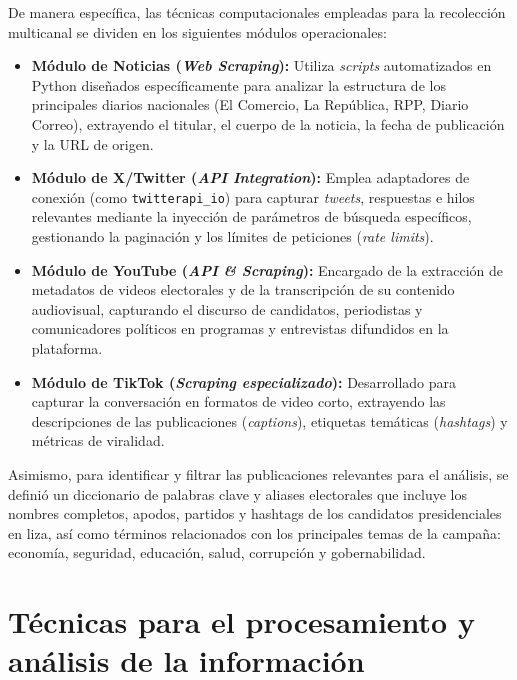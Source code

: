 De manera específica, las técnicas computacionales empleadas para la recolección multicanal se dividen en los siguientes módulos operacionales:
\begin{itemize}
    \item \textbf{Módulo de Noticias (\textit{Web Scraping}):} Utiliza \textit{scripts} automatizados en Python diseñados específicamente para analizar la estructura de los principales diarios nacionales (El Comercio, La República, RPP, Diario Correo), extrayendo el titular, el cuerpo de la noticia, la fecha de publicación y la URL de origen.
    \item \textbf{Módulo de X/Twitter (\textit{API Integration}):} Emplea adaptadores de conexión (como \texttt{twitterapi\_io}) para capturar \textit{tweets}, respuestas e hilos relevantes mediante la inyección de parámetros de búsqueda específicos, gestionando la paginación y los límites de peticiones (\textit{rate limits}).
    \item \textbf{Módulo de YouTube (\textit{API \& Scraping}):} Encargado de la extracción de metadatos de videos electorales y de la transcripción de su contenido audiovisual, capturando el discurso de candidatos, periodistas y comunicadores políticos en programas y entrevistas difundidos en la plataforma.
    \item \textbf{Módulo de TikTok (\textit{Scraping especializado}):} Desarrollado para capturar la conversación en formatos de video corto, extrayendo las descripciones de las publicaciones (\textit{captions}), etiquetas temáticas (\textit{hashtags}) y métricas de viralidad.
\end{itemize}

Asimismo, para identificar y filtrar las publicaciones relevantes para el análisis, se
definió un diccionario de palabras clave y aliases electorales que incluye los nombres
completos, apodos, partidos y hashtags de los candidatos presidenciales en liza, así como
términos relacionados con los principales temas de la campaña: economía, seguridad,
educación, salud, corrupción y gobernabilidad.
 

\section{Técnicas para el procesamiento y análisis de la información}
 
